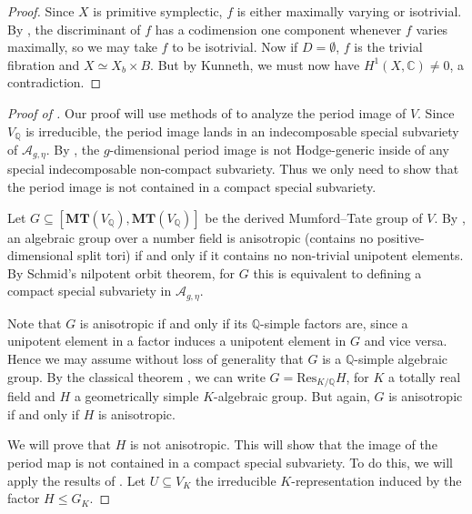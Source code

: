 \documentclass[12pt]{amsart}
\newcommand{\Q}{\mathbb{Q}}
\newcommand{\C}{\mathbb{C}}
\newcommand{\cA}{\mathcal{A}}
\theoremstyle{definition}
\numberwithin{equation}{section}
\begin{document}
\begin{proof}
Since \(X\) is primitive symplectic, \(f\) is either maximally varying or isotrivial. 
By , the discriminant of \(f\) has a codimension one component 
whenever \(f\) varies maximally, so we may take \(f\) to be isotrivial. 
Now if \(D = \emptyset\), \(f\) is the trivial fibration and \(X \simeq X_b \times B\).
But by Kunneth, we must now have \(H^1(X, \C) \neq 0\), a contradiction.
\end{proof}


\begin{proof}[Proof of ]


Our proof will use methods of \cite{grushevsky-mondello-manni-tsimerman25} 
to analyze the period image of \(V\).
Since \(V_\Q\) is irreducible, the period image lands in an 
indecomposable special subvariety of \(\cA_{g, \eta}\). By \cite[Theorem 4.5]{grushevsky-mondello-manni-tsimerman25}, 
the \(g\)-dimensional period image is not Hodge-generic inside of any special indecomposable 
non-compact subvariety. Thus we only need to show that the period image is not
contained in a compact special subvariety.


Let \(G \subseteq [\mathbf{MT}(V_\Q), \mathbf{MT}(V_\Q)]\) be the derived Mumford--Tate 
group of \(V\). By \cite[Corollary 8.5]{borel-tits65}, an algebraic group over a 
number field is anisotropic (contains no positive-dimensional split tori) if and only if 
it contains no non-trivial unipotent elements. By Schmid's nilpotent orbit theorem, 
for \(G\) this is equivalent to defining a compact special subvariety in \(\cA_{g, \eta}\).

Note that \(G\) is anisotropic if and only if its \(\Q\)-simple factors are, since 
a unipotent element in a factor induces a unipotent element in \(G\) and vice versa. Hence 
we may assume without loss of generality that \(G\) is a \(\Q\)-simple algebraic group.
By the classical theorem \cite[Corollary 2.7]{grushevsky-mondello-manni-tsimerman25}, 
we can write \(G = \mathrm{Res}_{K/\Q} H\), for \(K\) a totally real field and
\(H\) a geometrically simple \(K\)-algebraic group. But again, \(G\) is anisotropic 
if and only if \(H\) is anisotropic.

We will prove that \(H\) is not anisotropic. This will show that the image of the 
period map is not contained in a compact special subvariety. To do this, we 
will apply the results of \cite{scharlau85}. Let \(U \subseteq V_K\) the irreducible 
\(K\)-representation induced by the factor \(H \leq G_K\).


\end{proof}
\end{document}
